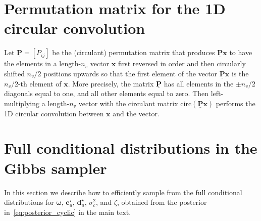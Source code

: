 \documentclass[12pt]{article}
\newcommand{\mycirc}[1] {\underline{\bm{#1}}}
\newcommand{\mybcirc}[1] {\underline{\underline{\bm{#1}}}}
\begin{document}


\section{Permutation matrix for the 1D circular convolution} \label{ap:permutation}
Let $\mycirc{P}=[P_{ij}]$ be the (circulant) permutation matrix that produces $\mycirc{P}\bm{x}$ to have the elements in a length-$n_v$ vector $\bm{x}$ first reversed in order and then circularly shifted $n_v/2$ positions upwards so that the first element of the vector $\mycirc{P}\bm{x}$ is the $n_v/2$-th element of $\bm{x}$. 
More precisely, the matrix $\mycirc{P}$ has all elements in the $\pm n_v/2$ diagonals equal to one, and all other elements equal to zero.
Then left-multiplying a length-$n_v$ vector with the circulant matrix $\mbox{circ}(\mycirc{P} \bm{x})$ 
performs the 1D circular convolution between $\bm{x}$ and the vector. 


\section{Full conditional distributions in the Gibbs sampler}\label{ap:gibbs}
In this section we describe how to efficiently sample from the full conditional distributions for $\bm{\omega}$, $\bm{c}_u^{\star}$, $\bm{d}_u^{\star}$, $\sigma_c^2$, and $\zeta$, obtained from the posterior in~\eqref{eq:posterior_cyclic} in the main text. 
\end{document}
